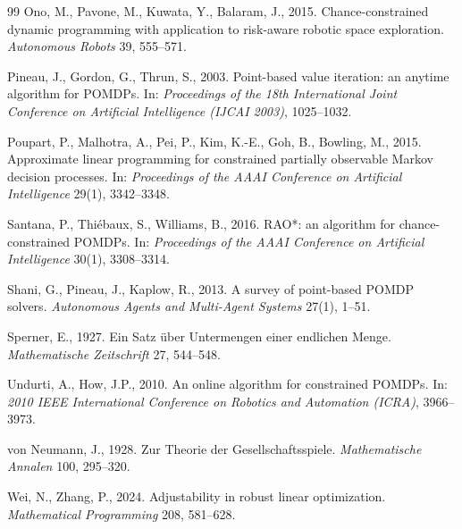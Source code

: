 \documentclass[11pt,a4paper]{article}
\theoremstyle{plain}
\theoremstyle{definition}
\theoremstyle{remark}
\begin{document}
\begin{thebibliography}{99}
 Ono, M., Pavone, M., Kuwata, Y., Balaram, J., 2015. Chance-constrained dynamic programming with application to risk-aware robotic space exploration. \emph{Autonomous Robots} 39, 555--571.

 Pineau, J., Gordon, G., Thrun, S., 2003. Point-based value iteration: an anytime algorithm for POMDPs. In: \emph{Proceedings of the 18th International Joint Conference on Artificial Intelligence (IJCAI 2003)}, 1025--1032.

 Poupart, P., Malhotra, A., Pei, P., Kim, K.-E., Goh, B., Bowling, M., 2015. Approximate linear programming for constrained partially observable Markov decision processes. In: \emph{Proceedings of the AAAI Conference on Artificial Intelligence} 29(1), 3342--3348.

 Santana, P., Thi\'ebaux, S., Williams, B., 2016. RAO*: an algorithm for chance-constrained POMDPs. In: \emph{Proceedings of the AAAI Conference on Artificial Intelligence} 30(1), 3308--3314.

 Shani, G., Pineau, J., Kaplow, R., 2013. A survey of point-based POMDP solvers. \emph{Autonomous Agents and Multi-Agent Systems} 27(1), 1--51.

 Sperner, E., 1927. Ein Satz \"uber Untermengen einer endlichen Menge. \emph{Mathematische Zeitschrift} 27, 544--548.

 Undurti, A., How, J.P., 2010. An online algorithm for constrained POMDPs. In: \emph{2010 IEEE International Conference on Robotics and Automation (ICRA)}, 3966--3973.

 von Neumann, J., 1928. Zur Theorie der Gesellschaftsspiele. \emph{Mathematische Annalen} 100, 295--320.

 Wei, N., Zhang, P., 2024. Adjustability in robust linear optimization. \emph{Mathematical Programming} 208, 581--628.

\end{thebibliography}
\end{document}
